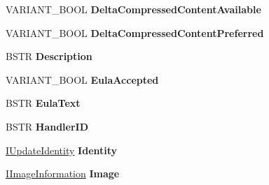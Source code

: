 \begin{DoxyCompactItemize}
V\+A\+R\+I\+A\+N\+T\+\_\+\+B\+O\+OL {\bfseries Delta\+Compressed\+Content\+Available}
\item 
\mbox{\label{interface_w_u_api_lib_1_1_i_update_ad46fb2cf70f08b664f173e3ad566f411}} 
V\+A\+R\+I\+A\+N\+T\+\_\+\+B\+O\+OL {\bfseries Delta\+Compressed\+Content\+Preferred}
\item 
\mbox{\label{interface_w_u_api_lib_1_1_i_update_a303dfe7dc335fe6554c379eac5d91f07}} 
B\+S\+TR {\bfseries Description}
\item 
\mbox{\label{interface_w_u_api_lib_1_1_i_update_a16ce8484cf7c2bd5f9313870b02cbbda}} 
V\+A\+R\+I\+A\+N\+T\+\_\+\+B\+O\+OL {\bfseries Eula\+Accepted}
\item 
\mbox{\label{interface_w_u_api_lib_1_1_i_update_aef9f8e31742538540cf62a2c0b716cb1}} 
B\+S\+TR {\bfseries Eula\+Text}
\item 
\mbox{\label{interface_w_u_api_lib_1_1_i_update_a4b85f7f46ced2a12cfa281d042fba110}} 
B\+S\+TR {\bfseries Handler\+ID}
\item 
\mbox{\label{interface_w_u_api_lib_1_1_i_update_aee75da72d88aa9da2e9d494ce9beb600}} 
\hyperlink{interface_w_u_api_lib_1_1_i_update_identity}{I\+Update\+Identity} {\bfseries Identity}
\item 
\mbox{\label{interface_w_u_api_lib_1_1_i_update_a4d669902de991c96b4814d642b11a91f}} 
\hyperlink{interface_w_u_api_lib_1_1_i_image_information}{I\+Image\+Information} {\bfseries Image}

\end{DoxyCompactItemize}
